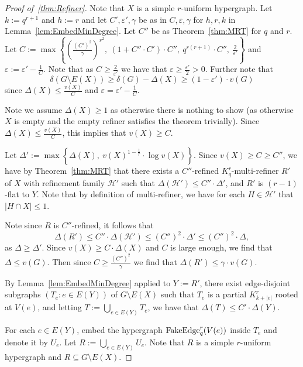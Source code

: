 \documentclass[11pt]{article}
\newcounter{i}
\theoremstyle{plain}
\renewcommand{\theclaim}{\thetheorem.\arabic{claim}}
\newenvironment{lateproof}[1]
 {%
  \renewcommand{\theclaim}{\ref{#1}.\arabic{claim}}%
  \begin{proof}[Proof of~\cref{#1}]%
 }
 {\end{proof}}
\theoremstyle{plain} %
\theoremstyle{definition}
\begin{document}
\begin{lateproof}{thm:Refiner}

 Note that $X$ is a simple $r$-uniform hypergraph. Let $k:= q^{r+1}$ and $h:= r$ and let $C',\varepsilon',\gamma$ be as in  $C,\varepsilon,\gamma$ for $h,r,k$ in Lemma~\ref{lem:EmbedMinDegree}. Let $C''$ be as Theorem~\ref{thm:MRT} for $q$ and $r$. Let $C:= \max\left\{ \left(\frac{(C')^2}{\gamma}\right)^{r^2},~(1+C''\cdot C') \cdot C'',~ q^{r(r+1)}\cdot C'',~\frac{2}{\varepsilon'}\right\}$ and $\varepsilon := \varepsilon' - \frac{1}{C}$. Note that as $C\ge \frac{2}{\varepsilon'}$ we have that $\varepsilon \ge \frac{\varepsilon'}{2} > 0$. Further note that $$\delta(G\setminus E(X)) \ge \delta(G) - \Delta(X) \ge (1-\varepsilon')\cdot v(G)$$ 
 since $\Delta(X) \le \frac{v(X)}{C}$ and $\varepsilon = \varepsilon'-\frac{1}{C}$.

Note we assume $\Delta(X)\ge 1$ as otherwise there is nothing to show (as otherwise $X$ is empty and the empty refiner satisfies the theorem trivially). Since $\Delta(X)\le \frac{v(X)}{C}$, this implies that $v(X)\ge C$.

Let $\Delta' := \max\left\{\Delta(X),~v(X)^{1-\frac{1}{r}}\cdot \log v(X)\right\}$. Since $v(X)\ge C\ge C''$, we have by Theorem~\ref{thm:MRT} that there exists a $C''$-refined $K_q^r$-multi-refiner $R'$ of $X$ with refinement family $\mathcal{H}'$ such that $\Delta(\mathcal{H}') \le C'' \cdot \Delta'$, and $R'$ is $(r-1)$-flat to $Y$. Note that by definition of multi-refiner, we have for each $H\in \mathcal{H}'$ that $|H\cap X|\le 1$.

 Note since $R$ is $C''$-refined, it follows that
 $$\Delta(R') \le C''\cdot \Delta(\mathcal{H}') \le (C'')^2 \cdot \Delta'\le (C'')^2 \cdot \Delta,$$ 
as $\Delta\ge \Delta'$. Since $v(X)\ge C\cdot \Delta(X)$ and $C$ is large enough, we find that $\Delta \le v(G)$. Then since $C\ge \frac{(C'')^2}{\gamma}$ we find that $\Delta(R')\le \gamma\cdot v(G)$.

By Lemma~\ref{lem:EmbedMinDegree} applied to $Y:=R'$, there exist edge-disjoint subgraphs $(T_e: e\in E(Y))$ of $G\setminus E(X)$ such that $T_e$ is a partial $K_{k+|e|}^r$ rooted at $V(e)$, and letting $T:= \bigcup_{e\in E(Y)} T_e$, we have that $\Delta(T) \le C'\cdot \Delta(Y)$. 

For each $e\in E(Y)$, embed the hypergraph ${\rm FakeEdge}_q^r(V(e))$ inside $T_e$ and denote it by $U_e$. Let $R:= \bigcup_{e\in E(Y)} U_e$. Note that $R$ is a simple $r$-uniform hypergraph and $R\subseteq G\setminus E(X)$. 


\end{lateproof}
\end{document}
